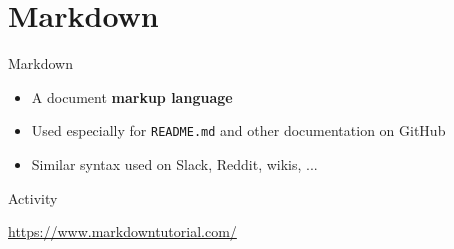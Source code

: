 \part{Markdown}
\frame{\partpage}

\begin{frame}{Markdown}
	\begin{itemize}
		\pause\item A document \textbf{markup language}
		\pause\item Used especially for \texttt{README.md} and other documentation on GitHub
		\pause\item Similar syntax used on Slack, Reddit, wikis, ...
	\end{itemize}
\end{frame}

\begin{frame}{Activity}
	\begin{center}
		\url{https://www.markdowntutorial.com/}
	\end{center}
\end{frame}
